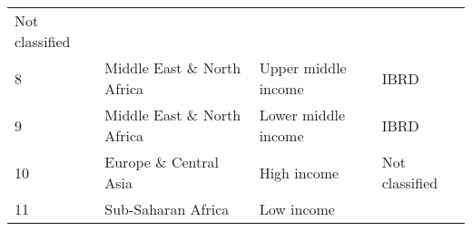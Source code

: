 \documentclass[
]{article}
\begin{document}
\begin{longtable}[]{@{}llll@{}}
\begin{minipage}[t]{0.16\columnwidth}
Not classified\strut
\end{minipage}\tabularnewline
\begin{minipage}[t]{0.06\columnwidth}\raggedright
8\strut
\end{minipage} & \begin{minipage}[t]{0.17\columnwidth}\raggedright
Middle East \& North Africa\strut
\end{minipage} & \begin{minipage}[t]{0.11\columnwidth}\raggedright
Upper middle income\strut
\end{minipage} & \begin{minipage}[t]{0.16\columnwidth}\raggedright
IBRD\strut
\end{minipage}\tabularnewline
\begin{minipage}[t]{0.06\columnwidth}\raggedright
9\strut
\end{minipage} & \begin{minipage}[t]{0.17\columnwidth}\raggedright
Middle East \& North Africa\strut
\end{minipage} & \begin{minipage}[t]{0.11\columnwidth}\raggedright
Lower middle income\strut
\end{minipage} & \begin{minipage}[t]{0.16\columnwidth}\raggedright
IBRD\strut
\end{minipage}\tabularnewline
\begin{minipage}[t]{0.06\columnwidth}\raggedright
10\strut
\end{minipage} & \begin{minipage}[t]{0.17\columnwidth}\raggedright
Europe \& Central Asia\strut
\end{minipage} & \begin{minipage}[t]{0.11\columnwidth}\raggedright
High income\strut
\end{minipage} & \begin{minipage}[t]{0.16\columnwidth}\raggedright
Not classified\strut
\end{minipage}\tabularnewline
\begin{minipage}[t]{0.06\columnwidth}\raggedright
11\strut
\end{minipage} & \begin{minipage}[t]{0.17\columnwidth}\raggedright
Sub-Saharan Africa\strut
\end{minipage} & \begin{minipage}[t]{0.11\columnwidth}\raggedright
Low income\strut
\end{minipage} & \begin{minipage}[t]{0.16\columnwidth}\raggedright

\end{minipage}
\end{longtable}
\end{document}
